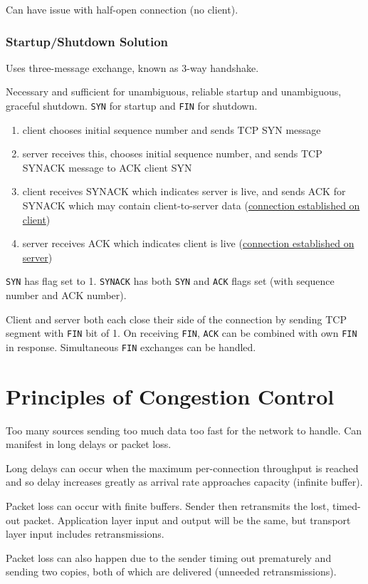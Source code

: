 \documentclass[11pt]{article}
\begin{document}
Can have issue with half-open connection (no client).
\subsubsection{Startup/Shutdown Solution}
\label{sec:orgdd1a38f}
Uses three-message exchange, known as 3-way handshake.

Necessary and sufficient for unambiguous, reliable startup and unambiguous, graceful shutdown.
\texttt{SYN} for startup and \texttt{FIN} for shutdown.

\begin{enumerate}
\item client chooses initial sequence number and sends TCP SYN message
\item server receives this, chooses initial sequence number, and sends TCP SYNACK message to ACK client SYN
\item client receives SYNACK which indicates server is live, and sends ACK for SYNACK which may contain
client-to-server data (\uline{connection established on client})
\item server receives ACK which indicates client is live (\uline{connection established on server})
\end{enumerate}

\texttt{SYN} has flag set to 1. \texttt{SYNACK} has both \texttt{SYN} and \texttt{ACK} flags set (with sequence number and
ACK number).

Client and server both each close their side of the connection by sending TCP segment with
\texttt{FIN} bit of 1.
On receiving \texttt{FIN}, \texttt{ACK} can be combined with own \texttt{FIN} in response.
Simultaneous \texttt{FIN} exchanges can be handled.
\section{Principles of Congestion Control}
\label{sec:orgbe8b31d}
Too many sources sending too much data too fast for the network to handle.
Can manifest in long delays or packet loss.

Long delays can occur when the maximum per-connection throughput is reached and so delay
increases greatly as arrival rate approaches capacity (infinite buffer).

Packet loss can occur with finite buffers. Sender then retransmits the lost, timed-out packet.
Application layer input and output will be the same, but transport layer input includes
retransmissions.

Packet loss can also happen due to the sender timing out prematurely and sending two copies, both
of which are delivered (unneeded retransmissions).
\end{document}
